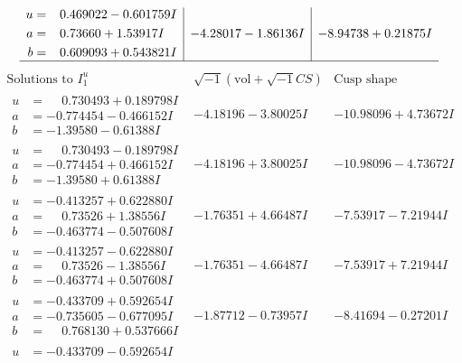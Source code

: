 \documentclass[1p]{elsarticle_modified}
\theoremstyle{definition}
\newcommand{\I}{\sqrt{-1}}
\begin{document}
$$\begin{array}{c|c|c}
\begin{aligned}
u &= \phantom{-}0.469022 - 0.601759 I \\
a &= \phantom{-}0.73660 + 1.53917 I \\
b &= \phantom{-}0.609093 + 0.543821 I\end{aligned}
 & -4.28017 - 1.86136 I & -8.94738 + 0.21875 I\\
 \hline 
 \end{array}$$\newpage$$\begin{array}{c|c|c}  
\text{Solutions to }I^u_{1}& \I (\text{vol} + \sqrt{-1}CS) & \text{Cusp shape}\\
 \hline 
\begin{aligned}
u &= \phantom{-}0.730493 + 0.189798 I \\
a &= -0.774454 - 0.466152 I \\
b &= -1.39580 - 0.61388 I\end{aligned}
 & -4.18196 - 3.80025 I & -10.98096 + 4.73672 I \\ \hline\begin{aligned}
u &= \phantom{-}0.730493 - 0.189798 I \\
a &= -0.774454 + 0.466152 I \\
b &= -1.39580 + 0.61388 I\end{aligned}
 & -4.18196 + 3.80025 I & -10.98096 - 4.73672 I \\ \hline\begin{aligned}
u &= -0.413257 + 0.622880 I \\
a &= \phantom{-}0.73526 + 1.38556 I \\
b &= -0.463774 - 0.507608 I\end{aligned}
 & -1.76351 + 4.66487 I & -7.53917 - 7.21944 I \\ \hline\begin{aligned}
u &= -0.413257 - 0.622880 I \\
a &= \phantom{-}0.73526 - 1.38556 I \\
b &= -0.463774 + 0.507608 I\end{aligned}
 & -1.76351 - 4.66487 I & -7.53917 + 7.21944 I \\ \hline\begin{aligned}
u &= -0.433709 + 0.592654 I \\
a &= -0.735605 - 0.677095 I \\
b &= \phantom{-}0.768130 + 0.537666 I\end{aligned}
 & -1.87712 - 0.73957 I & -8.41694 - 0.27201 I \\ \hline\begin{aligned}
u &= -0.433709 - 0.592654 I \\

\end{aligned}
\end{array}$$
\end{document}

